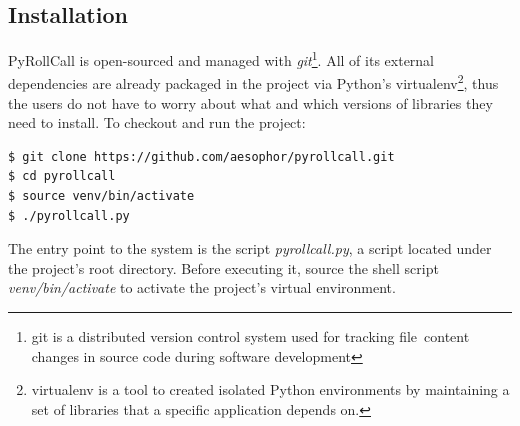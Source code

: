 \subsection{Installation}
PyRollCall is open-sourced and managed with \emph{git}\footnote{git is a distributed version control system used for tracking file\
  content changes in source code during software development}. All of its external dependencies are already packaged
in the project via Python's {virtualenv}\footnote{virtualenv is a tool to created isolated Python environments by maintaining a set of libraries that a specific application depends on.},
thus the users do not have to worry about what and which versions of libraries they need to install. To checkout and run the project:

\begin{lstlisting}[numbers=none,xleftmargin=0em,caption={Shell commands to checkout and run PyRollCall}]
$ git clone https://github.com/aesophor/pyrollcall.git
$ cd pyrollcall
$ source venv/bin/activate
$ ./pyrollcall.py 
\end{lstlisting}

The entry point to the system is the script \emph{pyrollcall.py}, a script located under the project's root directory.
Before executing it, source the shell script \emph{venv/bin/activate} to activate the project's virtual environment.
